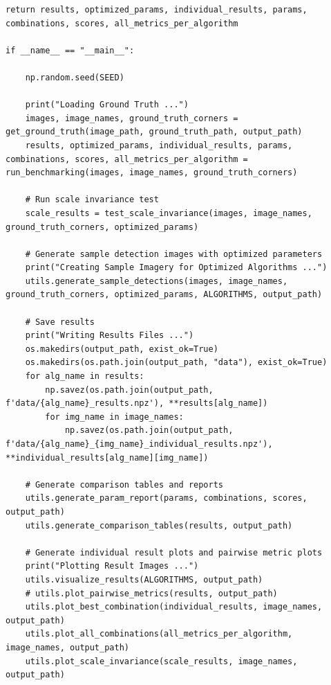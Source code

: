 \documentclass[journal]{IEEEtran}
\begin{document}
\begin{lstlisting}[style=python, caption={Driver Script for Project}, label={lst:driver}]
    return results, optimized_params, individual_results, params, combinations, scores, all_metrics_per_algorithm

if __name__ == "__main__":

    np.random.seed(SEED)
    
    print("Loading Ground Truth ...")
    images, image_names, ground_truth_corners = get_ground_truth(image_path, ground_truth_path, output_path)
    results, optimized_params, individual_results, params, combinations, scores, all_metrics_per_algorithm = run_benchmarking(images, image_names, ground_truth_corners)
    
    # Run scale invariance test
    scale_results = test_scale_invariance(images, image_names, ground_truth_corners, optimized_params)
        
    # Generate sample detection images with optimized parameters
    print("Creating Sample Imagery for Optimized Algorithms ...")
    utils.generate_sample_detections(images, image_names, ground_truth_corners, optimized_params, ALGORITHMS, output_path)
    
    # Save results
    print("Writing Results Files ...")
    os.makedirs(output_path, exist_ok=True)
    os.makedirs(os.path.join(output_path, "data"), exist_ok=True)
    for alg_name in results:
        np.savez(os.path.join(output_path, f'data/{alg_name}_results.npz'), **results[alg_name])
        for img_name in image_names:
            np.savez(os.path.join(output_path, f'data/{alg_name}_{img_name}_individual_results.npz'), **individual_results[alg_name][img_name])
    
    # Generate comparison tables and reports
    utils.generate_param_report(params, combinations, scores, output_path)
    utils.generate_comparison_tables(results, output_path)
    
    # Generate individual result plots and pairwise metric plots
    print("Plotting Result Images ...")
    utils.visualize_results(ALGORITHMS, output_path)
    # utils.plot_pairwise_metrics(results, output_path)
    utils.plot_best_combination(individual_results, image_names, output_path)
    utils.plot_all_combinations(all_metrics_per_algorithm, image_names, output_path)
    utils.plot_scale_invariance(scale_results, image_names, output_path)
\end{lstlisting}
\bigskip
\bigskip
\end{document}
